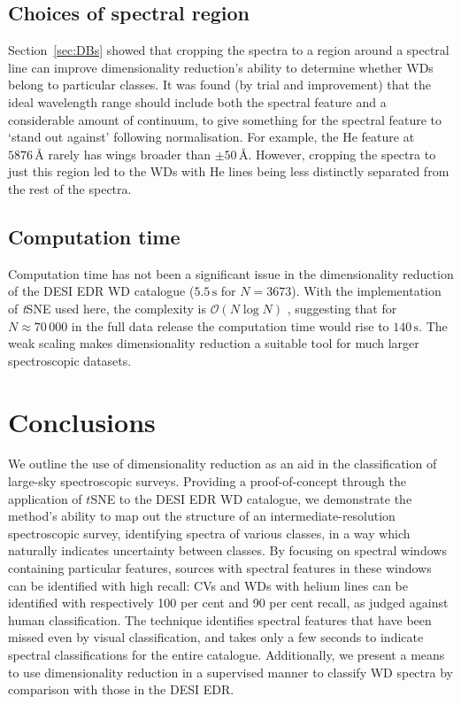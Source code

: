 \documentclass[fleqn,usenatbib]{mnras}
\begin{document}
\subsection{Choices of spectral region}

Section~\ref{sec:DBs} showed that cropping the spectra to a region around a spectral line can improve dimensionality reduction's ability to determine whether WDs belong to particular classes.
It was found (by trial and improvement) that the ideal wavelength range should include both the spectral feature and a considerable amount of continuum, to give something for the spectral feature to `stand out against' following normalisation.
For example, the He feature at $5876\,\text{\AA}$ rarely has wings broader than $\pm50\,\text{\AA}$.
However, cropping the spectra to just this region led to the WDs with He lines being less distinctly separated from the rest of the spectra.


\subsection{Computation time}

Computation time has not been a significant issue in the dimensionality reduction of the DESI EDR WD catalogue ($5.5\,\text{s}$ for $N=3673$).
With the implementation of \textit{t}SNE used here, the complexity is $\mathcal{O}(N\log N)$ \citep{barneshut, vandermaaten14}, suggesting that for $N\approx 70\,000$ in the full data release the computation time would rise to $140\,\text{s}$.
The weak scaling makes dimensionality reduction a suitable tool for much larger spectroscopic datasets.

\section{Conclusions}
\label{sec:conclusions}

We outline the use of dimensionality reduction as an aid in the classification of large-sky spectroscopic surveys.
Providing a proof-of-concept through the application of $t$SNE to the DESI EDR WD catalogue, we demonstrate the method's ability to map out the structure of an intermediate-resolution spectroscopic survey, identifying spectra of various classes, in a way which naturally indicates uncertainty between classes.
By focusing on spectral windows containing particular features, sources with spectral features in these windows can be identified with high recall: CVs and WDs with helium lines can be identified with respectively 100 per cent and 90 per cent recall, as judged against human classification.
The technique identifies spectral features that have been missed even by visual classification, and takes only a few seconds to indicate spectral classifications for the entire catalogue.
Additionally, we present a means to use dimensionality reduction in a supervised manner to classify WD spectra by comparison with those in the DESI EDR.
\end{document}
